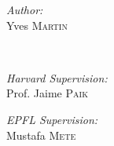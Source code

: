\begin{titlepage}
	\begin{minipage}{0.3\textwidth}
		\begin{flushleft} \large
			\emph{Author:}\\
			Yves \textsc{Martin} \\
			\end{flushleft}
			\end{minipage}~
			\begin{minipage}{0.3\textwidth}
			\centering\large
			\emph{Harvard Supervision:} \\
			Prof. Jaime \textsc{Paik}
			\end{minipage}
			\begin{minipage}{0.3\textwidth}
			\begin{flushright} \large
			\emph{EPFL Supervision:} \\
		    Mustafa \textsc{Mete}\\
		\end{flushright}
	\end{minipage}\\[2 cm]
	
	\leavevmode \\[1cm]
	\vfill

 

	
\end{titlepage}